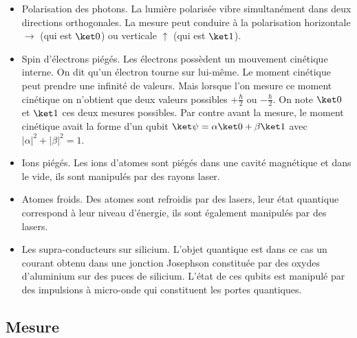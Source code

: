 \documentclass[11pt,class=report,crop=false]{standalone}
\begin{document}
\begin{itemize}

  \item Polarisation des photons. La lumière polarisée vibre simultanément dans deux directions orthogonales. La mesure peut conduire à la polarisation horizontale $\rightarrow$ (qui est $\ket0$) ou verticale $\uparrow$ (qui est $\ket1$).

  \item Spin d'électrons piégés. Les électrons possèdent un mouvement cinétique interne. On dit qu'un électron \og{}tourne sur lui-même\fg{}. Le moment cinétique peut prendre une infinité de valeurs. Mais lorsque l'on mesure ce moment cinétique on n'obtient que deux valeurs possibles $+\frac\hbar2$ ou $-\frac\hbar2$.
  On note $\ket0$ et $\ket1$ ces deux mesures possibles. 
  Par contre avant la mesure, le moment cinétique avait la forme d'un qubit
  $\ket\psi = \alpha\ket0+\beta\ket1$ avec $|\alpha|^2+|\beta|^2=1$.
 
  \item Ions piégés. Les ions d'atomes sont piégés dans une cavité magnétique et dans le vide, ils sont manipulés par des rayons laser.
  
  \item Atomes froids. Des atomes sont refroidis par des lasers, leur état quantique correspond à leur niveau d'énergie, ils sont également manipulés par des lasers.
  
  \item Les supra-conducteurs sur silicium. L'objet quantique est dans ce cas un courant obtenu dans une jonction Josephson constituée par des oxydes d'aluminium sur des puces de silicium. L'état de ces qubits est manipulé par des impulsions à micro-onde qui constituent les portes quantiques.
  
  
\end{itemize}

\subsection{Mesure}


\end{document}
